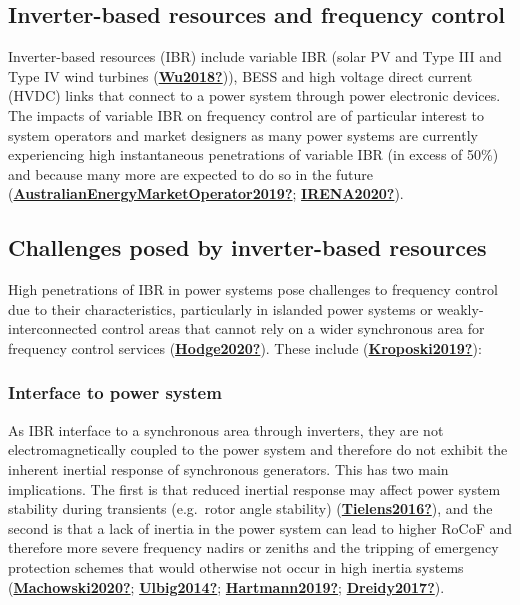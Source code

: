 \documentclass[12pt,a4paper,]{report}
\begin{document}
\hypertarget{sec:ibr_freq}{%
\subsection{Inverter-based resources and frequency
control}\label{sec:ibr_freq}}

Inverter-based resources (IBR) include variable IBR (solar PV and Type
III and Type IV wind turbines
(\protect\hyperlink{ref-Wu2018}{\textbf{Wu2018?}})), BESS and high
voltage direct current (HVDC) links that connect to a power system
through power electronic devices. The impacts of variable IBR on
frequency control are of particular interest to system operators and
market designers as many power systems are currently experiencing high
instantaneous penetrations of variable IBR (in excess of 50\%) and
because many more are expected to do so in the future
(\protect\hyperlink{ref-AustralianEnergyMarketOperator2019}{\textbf{AustralianEnergyMarketOperator2019?}};
\protect\hyperlink{ref-IRENA2020}{\textbf{IRENA2020?}}).

\hypertarget{challenges-posed-by-inverter-based-resources}{%
\subsection{Challenges posed by inverter-based
resources}\label{challenges-posed-by-inverter-based-resources}}

High penetrations of IBR in power systems pose challenges to frequency
control due to their characteristics, particularly in islanded power
systems or weakly-interconnected control areas that cannot rely on a
wider synchronous area for frequency control services
(\protect\hyperlink{ref-Hodge2020}{\textbf{Hodge2020?}}). These include
(\protect\hyperlink{ref-Kroposki2019}{\textbf{Kroposki2019?}}):

\hypertarget{interface-to-power-system}{%
\subsubsection{Interface to power
system}\label{interface-to-power-system}}

As IBR interface to a synchronous area through inverters, they are not
electromagnetically coupled to the power system and therefore do not
exhibit the inherent inertial response of synchronous generators. This
has two main implications. The first is that reduced inertial response
may affect power system stability during transients (e.g.~rotor angle
stability) (\protect\hyperlink{ref-Tielens2016}{\textbf{Tielens2016?}}),
and the second is that a lack of inertia in the power system can lead to
higher RoCoF and therefore more severe frequency nadirs or zeniths and
the tripping of emergency protection schemes that would otherwise not
occur in high inertia systems
(\protect\hyperlink{ref-Machowski2020}{\textbf{Machowski2020?}};
\protect\hyperlink{ref-Ulbig2014}{\textbf{Ulbig2014?}};
\protect\hyperlink{ref-Hartmann2019}{\textbf{Hartmann2019?}};
\protect\hyperlink{ref-Dreidy2017}{\textbf{Dreidy2017?}}).
\end{document}
